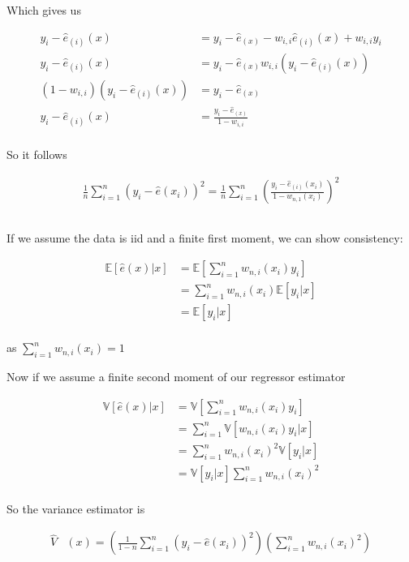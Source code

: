 \documentclass[12pt]{article}
\newcommand{\E}{\mathbb{E}}
\newcommand{\V}{\mathbb{V}}
\newcommand{\qsum}{\sum\limits_{i=1}^n}
\begin{document}
Which gives us

\begin{align*}
y_i - \hat{e}_{(i)}(x) &= y_i - \hat{e}_(x) - w_{i,i}\hat{e}_{(i)}(x) + w_{i,i}y_i\\
y_i - \hat{e}_{(i)}(x) &= y_i - \hat{e}_(x) w_{i,i}(y_i - \hat{e}_{(i)}(x))\\
(1 - w_{i,i}) ( y_i - \hat{e}_{(i)}(x))  &= y_i - \hat{e}_(x)\\
y_i - \hat{e}_{(i)}(x)  &= \frac{y_i - \hat{e}_(x)}{1-w_{i,i}}\\
\end{align*}

So it follows

\begin{gather*}
\frac{1}{n} \sum\limits_{i=1}^n (y_i - \hat{e}(x_i))^2  =  \frac{1}{n} \sum\limits_{i=1}^n \left( \frac{y_i - \hat{e}_{(i)}(x_i)} {1-w_{n,1}(x_i)} \right)^2
\end{gather*}

\subsection{}

If we assume the data is iid and a finite first moment, we can show consistency:

\begin{align*}
\E[\hat{e}(x) | x] &= \E\left[\qsum w_{n,i}(x_i)y_i\right]\\
&= \qsum w_{n,i}(x_i)\E[y_i | x ]\\
&= \E[y_i | x ]\\
\end{align*}

as $ \qsum w_{n,i}(x_i) = 1 $


Now if we assume a finite second moment of our regressor estimator

\begin{align*}
\V[\hat{e}(x) | x] &= \V \left[\qsum w_{n,i}(x_i)y_i\right]\\
&= \qsum \V[w_{n,i}(x_i)y_i | x ]\\
&= \qsum w_{n,i}(x_i)^2 \V[y_i | x ]\\
&= \V[y_i | x ] \qsum w_{n,i}(x_i)^2 \\
\end{align*}


So the variance estimator is

\begin{align*}
\hat{V}&(x) = \left(\frac{1}{1-n} \qsum (y_i - \hat{e}(x_i))^2 \right) \left( \qsum w_{n,i}(x_i)^2\right)
\end{align*}
\end{document}
